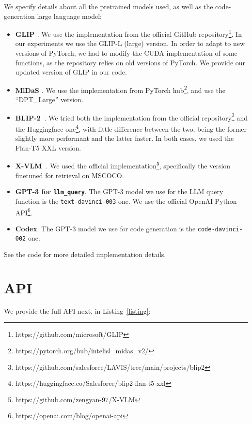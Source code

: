 \documentclass[10pt,twocolumn,letterpaper]{article}
\begin{document}
We specify details about all the pretrained models used, as well as the code-generation large language model:
\begin{itemize}
    \item \textbf{GLIP \cite{li2022grounded}}. We use the implementation from the official GitHub repository\footnote{https://github.com/microsoft/GLIP}. In our experiments we use the GLIP-L (large) version. In order to adapt to new versions of PyTorch, we had to modify the CUDA implementation of some functions, as the repository relies on old versions of PyTorch. We provide our updated version of GLIP in our code. 
    \item \textbf{MiDaS \cite{Ranftl2022}}. We use the implementation from PyTorch hub\footnote{https://pytorch.org/hub/intelisl\_midas\_v2/}, and use the ``DPT\_Large'' version.
    \item \textbf{BLIP-2~\cite{li_blip-2_2023}}. We tried both the implementation from the official repository\footnote{https://github.com/salesforce/LAVIS/tree/main/projects/blip2} and the Huggingface one\footnote{https://huggingface.co/Salesforce/blip2-flan-t5-xxl}, with little difference between the two, being the former slightly more performant and the latter faster. In both cases, we used the Flan-T5 XXL version.
    \item \textbf{X-VLM~\cite{zeng2021multi}}. We used the official implementation\footnote{https://github.com/zengyan-97/X-VLM}, specifically the version finetuned for retrieval on MSCOCO.
    \item \textbf{GPT-3 for \texttt{llm\_query}}. The GPT-3 model we use for the LLM query function is the \texttt{text-davinci-003} one. We use the official OpenAI Python API\footnote{https://openai.com/blog/openai-api}.
    \item \textbf{Codex}. The GPT-3 model we use for code generation is the \texttt{code-davinci-002} one.
\end{itemize}
See the code for more detailed implementation details.


\section{API}
\label{sec:appendix_api}

We provide the full API next, in Listing~\ref{listing}:
\end{document}
